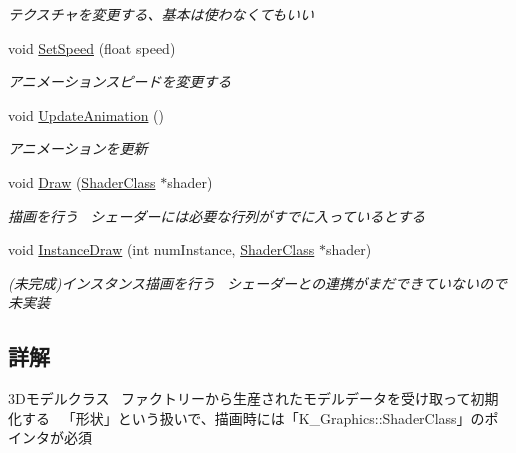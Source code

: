 \begin{DoxyCompactItemize}
\begin{DoxyCompactList}\small\item\em テクスチャを変更する、基本は使わなくてもいい \end{DoxyCompactList}\item 
void \mbox{\hyperlink{class_k___graphics_1_1_mesh_model_a6a691bb67f21e90cfeffe89d02fd2fa2}{Set\+Speed}} (float speed)
\begin{DoxyCompactList}\small\item\em アニメーションスピードを変更する \end{DoxyCompactList}\item 
void \mbox{\hyperlink{class_k___graphics_1_1_mesh_model_abdf4e1efb588647fa962296ac4bbed32}{Update\+Animation}} ()
\begin{DoxyCompactList}\small\item\em アニメーションを更新 \end{DoxyCompactList}\item 
void \mbox{\hyperlink{class_k___graphics_1_1_mesh_model_a2f3e54e2d4edaf4d54744446971447f3}{Draw}} (\mbox{\hyperlink{class_k___graphics_1_1_shader_class}{Shader\+Class}} $\ast$shader)
\begin{DoxyCompactList}\small\item\em 描画を行う~\newline
シェーダーには必要な行列がすでに入っているとする \end{DoxyCompactList}\item 
void \mbox{\hyperlink{class_k___graphics_1_1_mesh_model_ad6da27db2ea78c8b7b531707973d33f1}{Instance\+Draw}} (int num\+Instance, \mbox{\hyperlink{class_k___graphics_1_1_shader_class}{Shader\+Class}} $\ast$shader)
\begin{DoxyCompactList}\small\item\em (未完成)インスタンス描画を行う~\newline
シェーダーとの連携がまだできていないので未実装 \end{DoxyCompactList}\end{DoxyCompactItemize}


\subsection{詳解}
3\+Dモデルクラス~\newline
ファクトリーから生産されたモデルデータを受け取って初期化する~\newline
「形状」という扱いで、描画時には「\+K\+\_\+\+Graphics\+::\+Shader\+Class」のポインタが必須 


